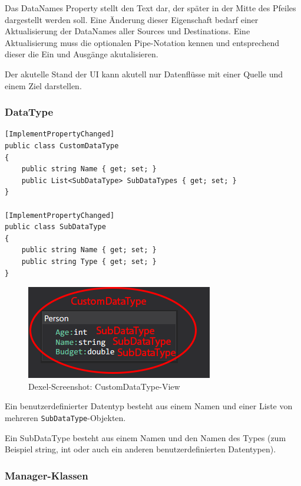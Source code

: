 Das DataNames Property stellt den Text dar, der später in der Mitte des
Pfeiles dargestellt werden soll. Eine Änderung dieser Eigenschaft bedarf
einer Aktualisierung der DataNames aller Sources und Destinations.
Eine Aktualisierung muss die optionalen Pipe-Notation kennen und
entsprechend dieser die Ein und Ausgänge akutalisieren.

Der akutelle Stand der UI kann akutell nur Datenflüsse mit einer Quelle und
einem Ziel darstellen.

\subsubsection{DataType}


\begin{lstlisting}[caption= CustomDataType und SubDataType Klasse]
[ImplementPropertyChanged]
public class CustomDataType
{
	public string Name { get; set; }
	public List<SubDataType> SubDataTypes { get; set; }
}

[ImplementPropertyChanged]
public class SubDataType
{
	public string Name { get; set; }
	public string Type { get; set; }
}
\end{lstlisting}


\begin{figure}[H]
	\centering
	\includegraphics[width=0.5\linewidth]{./img/CustomDataType.png} 
	\caption{Dexel-Screenshot: CustomDataType-View}
\end{figure}


Ein benutzerdefinierter Datentyp besteht aus einem Namen und einer Liste von mehreren
\texttt{SubDataType}-Objekten. 

Ein SubDataType besteht aus einem Namen und den Namen
des Types (zum Beispiel string, int oder auch ein anderen benutzerdefinierten
Datentypen).

\subsubsection{Manager-Klassen}

